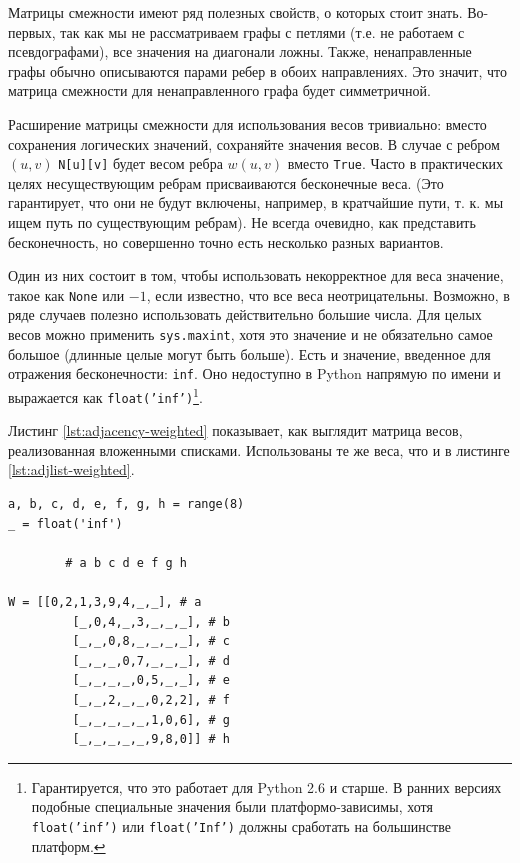 Матрицы смежности имеют ряд полезных свойств, о которых стоит знать. Во-первых, так как мы не рассматриваем графы с петлями (т.е. не работаем с псевдографами), все значения на диагонали ложны. Также, ненаправленные графы обычно описываются парами ребер в обоих направлениях. Это значит, что матрица смежности для ненаправленного графа будет симметричной.

Расширение матрицы смежности для использования весов тривиально: вместо сохранения логических значений, сохраняйте значения весов. В случае с ребром $(u, v)$ \texttt{N[u][v]} будет весом ребра $w(u,v)$ вместо \texttt{True}. Часто в практических целях несуществующим ребрам присваиваются бесконечные веса. (Это гарантирует, что они не будут включены, например, в кратчайшие пути, т. к. мы ищем путь по существующим ребрам). Не всегда очевидно, как представить бесконечность, но совершенно точно есть несколько разных вариантов.

Один из них состоит в том, чтобы использовать некорректное для веса значение, такое как \texttt{None} или $-1$, если известно, что все веса неотрицательны. Возможно, в ряде случаев полезно использовать действительно большие числа. Для целых весов можно применить \texttt{sys.maxint}, хотя это значение и не обязательно самое большое (длинные целые могут быть больше). Есть и значение, введенное для отражения бесконечности: \texttt{inf}. Оно недоступно в Python напрямую по имени и выражается как \texttt{float('inf')}\footnote{Гарантируется, что это работает для Python 2.6 и старше. В ранних версиях подобные специальные значения были платформо-зависимы, хотя \texttt{float('inf')} или \texttt{float('Inf')} должны сработать на большинстве платформ.}.

Листинг \ref{lst:adjacency-weighted} показывает, как выглядит матрица весов, реализованная вложенными списками. Использованы те же веса, что и в листинге \ref{lst:adjlist-weighted}.

\begin{lstlisting}[caption={Матрица весов с бесконечными значениями для отсутствующих ребер}, label={lst:adjacency-weighted}]
a, b, c, d, e, f, g, h = range(8)
_ = float('inf')

		# a b c d e f g h

W = [[0,2,1,3,9,4,_,_], # a
	 	 [_,0,4,_,3,_,_,_], # b
		 [_,_,0,8,_,_,_,_], # c
		 [_,_,_,0,7,_,_,_], # d
		 [_,_,_,_,0,5,_,_], # e
		 [_,_,2,_,_,0,2,2], # f
		 [_,_,_,_,_,1,0,6], # g
		 [_,_,_,_,_,9,8,0]] # h
\end{lstlisting}


